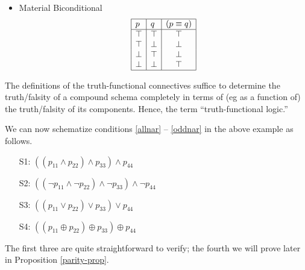 \begin{itemize}
\item Material Biconditional
\[
\begin{array}{|l|l|c|} \hline
p   & q  &  (p \equiv q)   \\ \hline
\top & \top & \top  \\
\top & \bot & \bot  \\
\bot & \top & \bot  \\   
\bot & \bot & \top \\
\hline
\end{array}
\]
\end{itemize}


The definitions of the truth-functional connectives suffice to determine the truth/falsity of a compound schema completely in terms of (eg as a function of) the truth/falsity of its components. Hence, the term ``truth-functional logic.'' 


We can now schematize conditions \ref{allnar} -- \ref{oddnar} in the above example as follows.

\begin{enumerate}
\item[S1:] $((p_{11}\wedge p_{22})\wedge p_{33})\wedge p_{44}$\label{sallnar}
\item[S2:] $((\neg p_{11}\wedge\neg p_{22})\wedge\neg p_{33})\wedge\neg p_{44}$\label{snonar}
\item[S3:] $((p_{11}\vee p_{22})\vee p_{33})\vee p_{44}$\label{sonenar}
\item[S4:] $((p_{11}\oplus p_{22})\oplus p_{33})\oplus p_{44}$\label{sevennar}
\end{enumerate}

The first three are quite straightforward to verify; the fourth we will prove later in Proposition \ref{parity-prop}. 
